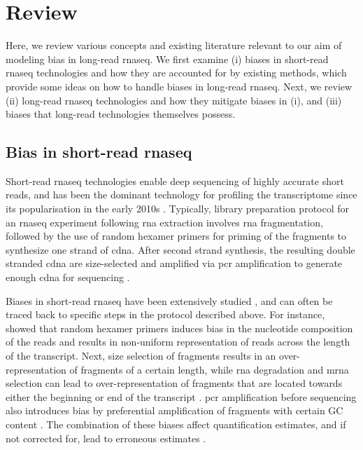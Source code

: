 \section{Review}

Here, we review various concepts and existing literature relevant to our aim of modeling bias in long-read \gls{rnaseq}. We first examine (i) biases in short-read \gls{rnaseq} technologies and how they are accounted for by existing methods, which provide some ideas on how to handle biases in long-read \gls{rnaseq}. Next, we review (ii) long-read \gls{rnaseq} technologies and how they mitigate biases in (i), and (iii) biases that long-read technologies themselves possess. 

\subsection{Bias in short-read \gls{rnaseq}}

Short-read \gls{rnaseq} technologies enable deep sequencing of highly accurate short reads, and has been the dominant technology for profiling the transcriptome since its popularisation in the early 2010s \cite{Lowe2017}. Typically, library preparation protocol for an \gls{rnaseq} experiment following \gls{rna} extraction involves \gls{rna} fragmentation, followed by the use of random hexamer primers for priming of the fragments to synthesize one strand of \gls{cdna}. After second strand synthesis, the resulting double stranded \gls{cdna} are size-selected and amplified via \gls{pcr} amplification to generate enough \gls{cdna} for sequencing \cite{Marguerat2010}.  

Biases in short-read \gls{rnaseq} have been extensively studied \cite{Hansen2010, Li2010, Roberts2011, Benjamini2012, Love2016}, and can often be traced back to specific steps in the protocol described above. For instance, \cite{Hansen2010} showed that random hexamer primers induces bias in the nucleotide composition of the reads and results in non-uniform representation of reads across the length of the transcript. Next, size selection of fragments results in an over-representation of fragments of a certain length, while \gls{rna} degradation and \gls{mrna} selection can lead to over-representation of fragments that are located towards either the beginning or end of the transcript \cite{Roberts2011, Love2016}.  \gls{pcr} amplification before sequencing also introduces bias by preferential amplification of fragments with certain GC content \cite{Benjamini2012, Love2016}. The combination of these biases affect quantification estimates, and if not corrected for, lead to erroneous estimates \cite{Roberts2011, Love2016}. 

